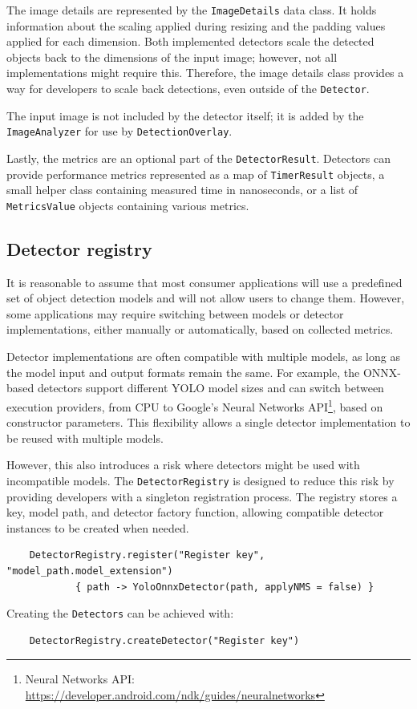 The image details are represented by the \texttt{ImageDetails} data class. It holds information about the scaling applied during resizing and the padding values applied for each dimension. Both implemented detectors scale the detected objects back to the dimensions of the input image; however, not all implementations might require this. Therefore, the image details class provides a way for developers to scale back detections, even outside of the \texttt{Detector}.

The input image is not included by the detector itself; it is added by the \texttt{ImageAnalyzer} for use by \texttt{DetectionOverlay}.

Lastly, the metrics are an optional part of the \texttt{DetectorResult}. Detectors can provide performance metrics represented as a map of \texttt{TimerResult} objects, a small helper class containing measured time in nanoseconds, or a list of \texttt{MetricsValue} objects containing various metrics.

\subsection{Detector registry}
\label{DetectorRegistry}
It is reasonable to assume that most consumer applications will use a predefined set of object detection models and will not allow users to change them. However, some applications may require switching between models or detector implementations, either manually or automatically, based on collected metrics.

Detector implementations are often compatible with multiple models, as long as the model input and output formats remain the same. For example, the ONNX-based detectors support different YOLO model sizes and can switch between execution providers, from CPU to Google's Neural Networks API\footnote{Neural Networks API: \url{https://developer.android.com/ndk/guides/neuralnetworks}}, based on constructor parameters. This flexibility allows a single detector implementation to be reused with multiple models.

However, this also introduces a risk where detectors might be used with incompatible models. The \texttt{DetectorRegistry} is designed to reduce this risk by providing developers with a singleton registration process. The registry stores a key, model path, and detector factory function, allowing compatible detector instances to be created when needed.

\begin{lstlisting}
    DetectorRegistry.register("Register key", "model_path.model_extension")
            { path -> YoloOnnxDetector(path, applyNMS = false) }
\end{lstlisting}
Creating the \texttt{Detectors} can be achieved with:
\begin{lstlisting}
    DetectorRegistry.createDetector("Register key")
\end{lstlisting}

